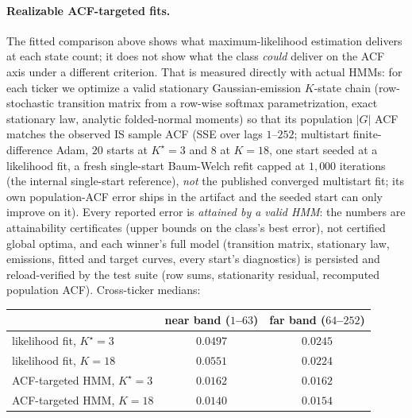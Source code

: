 \paragraph{Realizable ACF-targeted fits.}
The fitted comparison above shows what maximum-likelihood estimation delivers at each state count; it does not show what the class \emph{could} deliver on the ACF axis under a different criterion. That is measured directly with actual HMMs: for each ticker we optimize a valid stationary Gaussian-emission $K$-state chain (row-stochastic transition matrix from a row-wise softmax parametrization, exact stationary law, analytic folded-normal moments) so that its population $|G|$ ACF matches the observed IS sample ACF (SSE over lags $1$--$252$; multistart finite-difference Adam, $20$ starts at $K^\star = 3$ and $8$ at $K = 18$, one start seeded at a likelihood fit, a fresh single-start Baum-Welch refit capped at $1{,}000$ iterations (the internal single-start reference), \emph{not} the published converged multistart fit; its own population-ACF error ships in the artifact and the seeded start can only improve on it). Every reported error is \emph{attained by a valid HMM}: the numbers are attainability certificates (upper bounds on the class's best error), not certified global optima, and each winner's full model (transition matrix, stationary law, emissions, fitted and target curves, every start's diagnostics) is persisted and reload-verified by the test suite (row sums, stationarity residual, recomputed population ACF). Cross-ticker medians:

\begin{center}
\small
\begin{tabular}{l c c}
\toprule
 & near band ($1$--$63$) & far band ($64$--$252$) \\
\midrule
likelihood fit, $K^\star = 3$    & $0.0497$ & $0.0245$ \\
likelihood fit, $K = 18$         & $0.0551$ & $0.0224$ \\
ACF-targeted HMM, $K^\star = 3$  & $0.0162$ & $0.0162$ \\
ACF-targeted HMM, $K = 18$       & $0.0140$ & $0.0154$ \\
\bottomrule
\end{tabular}
\end{center}


